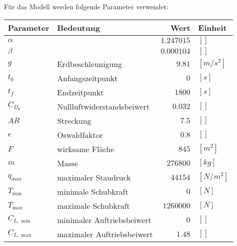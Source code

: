 Für das Modell werden folgende Parameter verwendet:
\begin{center}
\begin{tabular}{|l|l|r|l|}
\hline
Parameter & Bedeutung & Wert & Einheit \\ 
\hline 
$\alpha$ &  & $1.247015$ & $[]$ \\ 
$\beta$ &  & $0.000104$ & $[]$ \\ 
$g$ & Erdbeschleunigung & $9.81$ & $[m/s^2]$ \\ 
$t_0$ & Anfangszeitpunkt & $0$ & $[s]$ \\ 
$t_f$ & Endzeitpunkt & $1800$ & $[s]$ \\ 
$C_{D_0}$ & Nullluftwiderstandsbeiwert & $0.032$ & $[]$ \\ 
$AR$ & Streckung & $7.5$ & $[]$ \\ 
$e$ & Oswaldfaktor & $0.8$ & $[]$ \\ 
$F$ & wirksame Fläche & $845$ & $[m^2]$ \\ 
$m$ & Masse & $276800$ & $[kg]$ \\ 
$q_{\max}$ & maximaler Staudruck & $44154$ & $[N/m^2]$ \\
$T_{\min}$ & minimale Schubkraft & $0$ & $[N]$ \\  
$T_{\max}$ & maximale Schubkraft & $1260000$ & $[N]$ \\ 
$C_{L, \min}$ & minimaler Auftriebsbeiwert & $0$ & $[]$ \\ 
$C_{L, \max}$ & maximaler Auftriebsbeiwert & $1.48$ & $[]$ \\ 
\hline
\end{tabular} 
\end{center}

